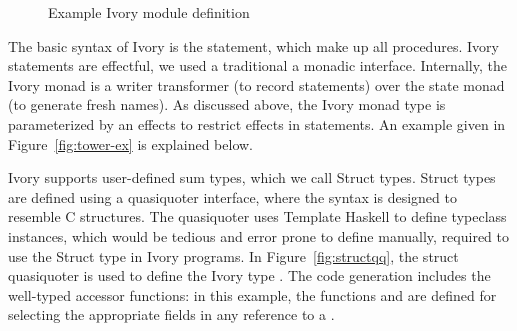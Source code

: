 \begin{figure}
  \caption{Example Ivory module definition}
  \label{fig:module}
\end{figure}



The basic syntax of Ivory is the statement, which make up all procedures.
Ivory statements are effectful, we used a traditional a monadic interface.
Internally, the Ivory monad is a writer transformer (to record
statements) over the state monad (to generate fresh names). As discussed above,
the Ivory monad type is parameterized by an effects to restrict effects in
statements. An example given in Figure~\ref{fig:tower-ex} is explained below.

Ivory supports user-defined  sum types, which we call Struct types.
Struct types are defined using a quasiquoter\cite{ghc-quasiquoter} interface,
where the syntax is designed to resemble C structures. The quasiquoter uses
Template Haskell\cite{ghc-templatehaskell} to define typeclass instances, which
would be tedious and error prone to define manually, required to use the Struct
type in Ivory programs. In Figure~\ref{fig:structqq}, the struct quasiquoter is
used to define the Ivory type . The code generation
includes the well-typed accessor functions: in this example, the functions
 and  are defined for selecting the
appropriate fields in any reference to a .


